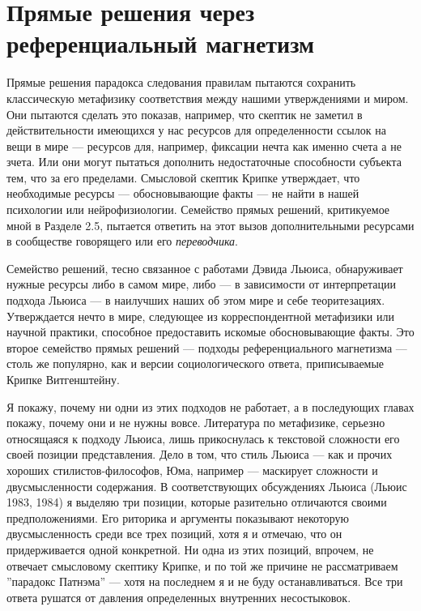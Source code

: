\documentclass[11pt]{book}
\begin{document}
\qquad

\section{Прямые решения через референциальный магнетизм}

Прямые решения парадокса следования правилам пытаются сохранить классическую метафизику соответствия между нашими утверждениями и миром. Они пытаются сделать это показав, например, что скептик не заметил в действительности имеющихся у нас ресурсов для определенности ссылок на вещи в мире --- ресурсов для, например, фиксации нечта как именно счета а не зчета. Или они могут пытаться дополнить недостаточные способности субъекта тем, что за его пределами. Смысловой скептик Крипке утверждает, что необходимые ресурсы --- обосновывающие факты --- не найти в нашей психологии или нейрофизиологии. Семейство прямых решений, критикуемое мной в Разделе 2.5, пытается ответить на этот вызов дополнительными ресурсами в сообществе говорящего или его \textit{переводчика}.

Семейство решений, тесно связанное с работами Дэвида Льюиса, обнаруживает нужные ресурсы либо в самом мире, либо --- в зависимости от интерпретации подхода Льюиса --- в наилучших наших об этом мире и себе теоритезациях. Утверждается нечто в мире, следующее из корреспондентной метафизики или научной практики, способное предоставить искомые обосновывающие факты. Это второе семейство прямых решений --- подходы референциального магнетизма --- столь же популярно, как и версии социологического ответа, приписываемые Крипке Витгенштейну.

Я покажу, почему ни одни из этих подходов не работает, а в последующих главах покажу, почему они и не нужны вовсе. Литература по метафизике, серьезно относящаяся к подходу Льюиса, лишь прикоснулась к текстовой сложности его своей позиции представления. Дело в том, что стиль Льюиса --- как и прочих хороших стилистов-философов, Юма, например --- маскирует сложности и двусмысленности содержания. В соответствующих обсуждениях Льюиса (Льюис 1983, 1984) я выделяю три позиции, которые разительно отличаются своими предположениями. Его риторика и аргументы показывают некоторую двусмысленность среди все трех позиций, хотя я и отмечаю, что он придерживается одной конкретной. Ни одна из этих позиций, впрочем, не отвечает смысловому скептику Крипке, и по той же причине не рассматриваем ''парадокс Патнэма'' --- хотя на последнем я и не буду останавливаться. Все три ответа рушатся от давления определенных внутренних несостыковок.
\end{document}
